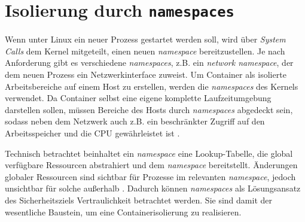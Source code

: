 \documentclass[../main.tex]{subfiles}
\begin{document}


	\section{Isolierung durch \texttt{namespaces}}
  \label{secIsolierung}
		Wenn unter Linux ein neuer Prozess gestartet werden soll, wird über \emph{System Calls} dem Kernel mitgeteilt, einen neuen \emph{namespace} bereitzustellen. Je nach Anforderung gibt es verschiedene \emph{namespaces}, z.B. ein \emph{network namespace}, der dem neuen Prozess ein Netzwerkinterface zuweist. Um Container als isolierte Arbeitsbereiche auf einem Host zu erstellen, werden die \emph{namespaces} des Kernels verwendet. Da Container selbst eine eigene komplette Laufzeitumgebung darstellen sollen, müssen Bereiche des Hosts durch \emph{namespaces} abgedeckt sein, sodass neben dem Netzwerk auch z.B. ein beschränkter Zugriff auf den Arbeitsspeicher und die \acrshort{CPU} gewährleistet ist \cite[S.3]{dockerIntroIEEE}.

		Technisch betrachtet beinhaltet ein \emph{namespace} eine Lookup-Tabelle, die global verfügbare Ressourcen abstrahiert und dem \emph{namespace} bereitstellt. Änderungen globaler Ressourcen sind sichtbar für Prozesse im relevanten \emph{namespace}, jedoch unsichtbar für solche außerhalb \cite[S.1+2]{IBMcheckpointRestart}\cite{namespaces}. Dadurch können \emph{namespaces} als Lösungsansatz des Sicherheitsziels Vertraulichkeit betrachtet werden. Sie sind damit der wesentliche Baustein, um eine Containerisolierung zu realisieren.

\end{document}
